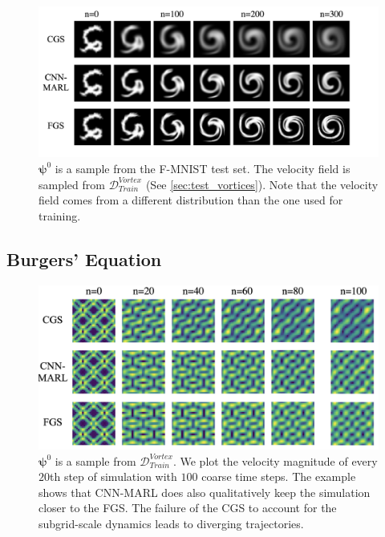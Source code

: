\begin{figure}[ht]
\vskip 0.2in
\begin{center}
\centerline{\includegraphics[width=0.75\columnwidth]{illustrations/advection/mnist_vortex_illustration.png}}
\caption{$\boldsymbol \psi^0$ is a sample from the F-MNIST test set. The velocity field is sampled from $\mathcal D^{Vortex}_{Train}$ (See \cref{sec:test_vortices}). Note that the velocity field comes from a different distribution than the one used for training.}
\end{center}
\vskip -0.2in
\end{figure}

\newpage
\subsection{Burgers' Equation}
\label{sec:adres}
\begin{figure}[ht]
\vskip 0.2in
\begin{center}
\centerline{\includegraphics[width=0.75\columnwidth]{illustrations/burgers/burgers_expl1.png}}
\caption{$\boldsymbol \psi^0$ is a sample from $\mathcal D_{Train}^{Vortex}$. We plot the velocity magnitude of every $20$th step of simulation with $100$ coarse time steps. The example shows that CNN-MARL does also qualitatively keep the simulation closer to the FGS. The failure of the CGS to account for the subgrid-scale dynamics leads to diverging trajectories.}
\label{fig:burgers_example}
\end{center}
\vskip -0.2in
\end{figure}

